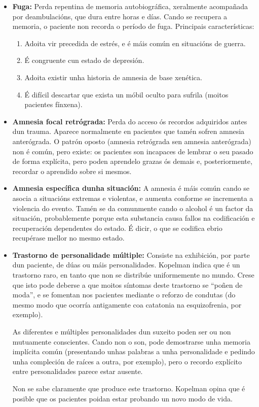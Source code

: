 \documentclass[a4paper,11pt]{article}
\begin{document}
\begin{itemize}
	\item \textbf{Fuga:} Perda repentina de memoria autobiográfica, xeralmente acompañada por 
	deambulacións, que dura entre horas e días. Cando se recupera a memoria, o paciente non recorda 
	o período de fuga. Principais características:
	\begin{enumerate}
		\item Adoita vir precedida de estrés, e é máis común en situacións de guerra.
		\item É congruente cun estado de depresión.
		\item Adoita existir unha historia de amnesia de base xenética.
		\item É difícil descartar que exista un móbil oculto para sufrila (moitos pacientes 
		fínxena).
	\end{enumerate}
	\item \textbf{Amnesia focal retrógrada:} Perda do acceso ós recordos adquiridos antes dun 
	trauma. Aparece normalmente en pacientes que tamén sofren amnesia anterógrada. O patrón oposto 
	(amnesia retrógrada sen amnesia anterógrada) non é común, pero existe: os pacientes son 
	incapaces de lembrar o seu pasado de forma explícita, pero poden aprendelo grazas ós demais e, 
	posteriormente, recordar o aprendido sobre si mesmos.
	\item \textbf{Amnesia específica dunha situación:} A amnesia é máis común cando se asocia a 
	situacións extremas e violentas, e aumenta conforme se incrementa a violencia do evento. Tamén 
	se da comunmente cando o alcohol é un factor da situación, probablemente porque esta substancia 
	causa fallos na codificación e recuperación dependentes do estado. É dicir, o que se codifica 
	ebrio recupérase mellor no mesmo estado. 
	\item \textbf{Trastorno de personalidade múltiple:} Consiste na exhibición, por parte dun 			
	paciente, de dúas ou máis personalidades. Kopelman indica que é un trastorno raro, en tanto que 
	non se distribúe uniformemente no mundo. Crese que isto pode deberse a que moitos síntomas deste 
	trastorno se ``poñen de moda'', e se fomentan nos pacientes mediante o reforzo de condutas (do 
	mesmo modo que ocorría antigamente coa catatonia na esquizofrenia, por exemplo).

	As diferentes e múltiples personalidades dun suxeito poden ser ou non mutuamente conscientes. 
	Cando non o son, pode demostrarse unha memoria implícita común (presentando unhas palabras a unha 
	personalidade e pedindo unha compleción de raíces a outra, por exemplo), pero o recordo explícito 
	entre personalidades parece estar ausente.

	Non se sabe claramente que produce este trastorno. Kopelman opina que é posible que os pacientes 
	poidan estar probando un novo modo de vida.
\end{itemize}
\end{document}
